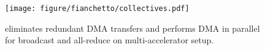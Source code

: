 %
%
%
%
%
%
%

\begin{figure}[t!]
    \centering
    \texttt{[image: figure/fianchetto/collectives.pdf]}
    \caption{\dmx eliminates redundant DMA transfers and performs DMA in parallel for broadcast and all-reduce on multi-accelerator setup.}
    \label{fig:res:collectives}
\end{figure}


